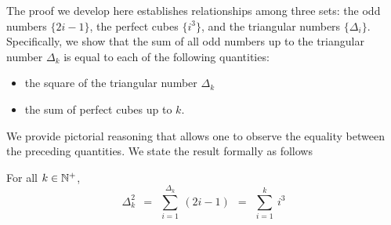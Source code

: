 \smallskip

The proof we develop here establishes relationships among three sets: the odd numbers $\{2i-1\}$, the perfect cubes $\{i^3\}$, and the triangular numbers $\{ \Delta_i \}$.  Specifically, we show that the sum of all odd numbers up to the triangular number $\Delta_k$ is equal to each of the following quantities:
\begin{itemize}
\item
the square of the triangular number $\Delta_k$
\medskip\item
the sum of perfect cubes up to $k$.
\end{itemize}
We provide pictorial reasoning that allows one to observe the equality between the preceding quantities.  We state the result formally as follows

\begin{prop}
\label{thm:odds-sum2-cubes}
For all $k \in \mathbb{N}^+$,
\begin{equation}
\label{eq:sum-odds=Delta-sq=sum-cubes}
\Delta_k^2 \ \  = \ \
\sum_{i=1}^{\Delta_k} \ (2i-1)  \ \ =  \ \ \sum_{i=1}^k \ i^3
\end{equation}
\end{prop}


